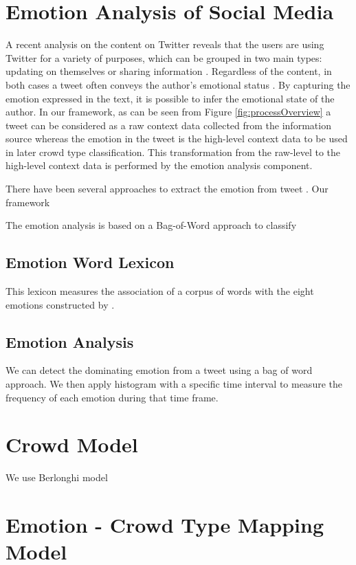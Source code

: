 \section{Emotion Analysis of Social Media}

A recent analysis on the content on Twitter reveals that the users are using Twitter for a variety of purposes, which can be grouped in two main types: updating on themselves or sharing information \citep{java2007we}. Regardless of the content, in both cases a tweet often conveys the author's emotional status \citep{bollen2009modeling}. By capturing the emotion expressed in the text, it is possible to infer the emotional state of the author. In our framework, as can be seen from Figure \ref{fig:processOverview} a tweet can be considered as a raw context data collected from the information source whereas the emotion in the tweet is the high-level context data to be used in later crowd type classification. This transformation from the raw-level to the high-level context data is performed by the emotion analysis component.

There have been several approaches to extract the emotion from tweet \citep{roberts2012empatweet, bollen2009modeling,mohammad2012emotional,mohammad2014using}. Our framework

The emotion analysis is based on a Bag-of-Word approach to classify 

\subsection{Emotion Word Lexicon}
This lexicon measures the association of a corpus of words with the eight emotions constructed by \citet{mohammad2014using}.

\subsection{Emotion Analysis}
We can detect the dominating emotion from a tweet using a bag of word approach. We then apply histogram with a specific time interval to measure the frequency of each emotion during that time frame.

\section{Crowd Model}

We use Berlonghi model

\section{Emotion - Crowd Type Mapping Model}

